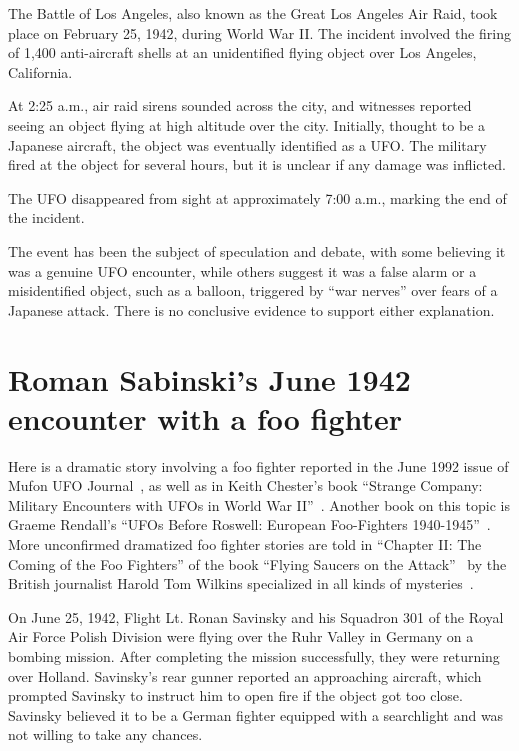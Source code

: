 The Battle of Los Angeles, also known as the Great Los Angeles Air Raid, took place on February 25, 1942, during World War II. The incident involved the firing of 1,400 anti-aircraft shells at an unidentified flying object over Los Angeles, California.

At 2:25 a.m., air raid sirens sounded across the city, and witnesses reported seeing an object flying at high altitude over the city. Initially, thought to be a Japanese aircraft, the object was eventually identified as a UFO. The military fired at the object for several hours, but it is unclear if any damage was inflicted.

The UFO disappeared from sight at approximately 7:00 a.m., marking the end of the incident.

The event has been the subject of speculation and debate, with some believing it was a genuine UFO encounter, while others suggest it was a false alarm or a misidentified object, such as a balloon, triggered by ``war nerves'' over fears of a Japanese attack. There is no conclusive evidence to support either explanation.




\section{Roman Sabinski's June 1942 encounter with a foo fighter}
\label{2023-UFO-part-History-chapter-pre-1945-RS42}




Here is a dramatic story involving a foo fighter reported in the June 1992 issue of Mufon UFO Journal~\cite{MUFONUFOJ-290},
as well as in Keith Chester's book ``Strange Company: {M}ilitary {E}ncounters with {UFO}s in {W}orld {W}ar {II}''~\cite{Chester2007May}.
Another book on this topic is Graeme Rendall's ``{UFO}s Before {R}oswell: {E}uropean {F}oo-{F}ighters 1940-1945''~\cite{Rendall2021Aug}.
More unconfirmed dramatized foo fighter stories are told
in ``Chapter II: The Coming of the Foo Fighters'' of the book ``Flying Saucers on the Attack''~\cite{Wilkins1954Jan}
by the British journalist Harold Tom Wilkins specialized in all kinds of mysteries~\cite{Wilkins1946,Wilkins2017Aug}.


On June 25, 1942, Flight Lt. Ronan Savinsky and his Squadron 301 of the Royal Air Force Polish Division were flying over the
Ruhr Valley in Germany on a bombing mission.
After completing the mission successfully, they were returning over Holland.
Savinsky's rear gunner reported an approaching aircraft, which prompted Savinsky to instruct him to open fire
if the object got too close. Savinsky believed it to be a German fighter equipped with a searchlight
and was not willing to take any chances.

